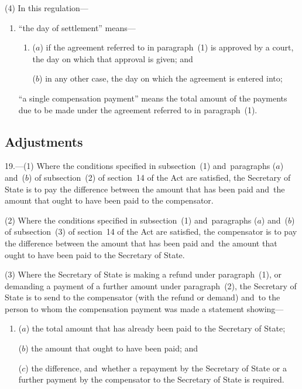 \documentclass[12pt,a4paper]{article}
\begin{document}
(4) In this regulation—
\begin{enumerate}\item[]
“the day of settlement” means—
\begin{enumerate}\item[]
($a$) 
if the agreement referred to in paragraph~(1) is approved by a court, the day on which that approval is given; and

($b$) 
in any other case, the day on which the agreement is entered into;
\end{enumerate}

“a single compensation payment” means the total amount of the payments due to be made under the agreement referred to in paragraph~(1).
\end{enumerate}

\subsection[19. Adjustments]{Adjustments}

19.---(1)  Where the conditions specified in subsection~(1) and~paragraphs ($a$)  and~($b$)  of subsection~(2) of section~14 of the Act are satisfied, the Secretary of State is to pay the difference between the amount that has been paid and~the amount that ought to have been paid to the compensator.

(2) Where the conditions specified in subsection~(1) and~paragraphs ($a$)  and~($b$)  of subsection~(3) of section~14 of the Act are satisfied, the compensator is to pay the difference between the amount that has been paid and~the amount that ought to have been paid to the Secretary of State.

(3) Where the Secretary of State is making a refund under paragraph~(1), or demanding a payment of a further amount under paragraph~(2), the Secretary of State is to send to the compensator (with the refund or demand) and~to the person to whom the compensation payment was made a statement showing—
\begin{enumerate}\item[]
($a$) the total amount that has already been paid to the Secretary of State;

($b$) the amount that ought to have been paid; and

($c$) the difference, and~whether a repayment by the Secretary of State or a further payment by the compensator to the Secretary of State is required.
\end{enumerate}
\end{document}
